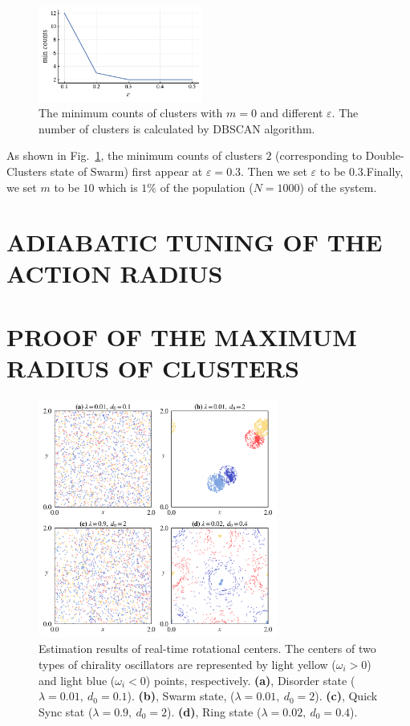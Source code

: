 \documentclass[%
 aip,
 amsmath,amssymb,
 reprint,%
]{revtex4-1}
\begin{document}
\begin{figure}[H]
    \includegraphics[width=0.48\textwidth]{./figs/DBSCANparam.pdf}
    \caption{
        \label{fig:DBSCANparam} The minimum counts of clusters with $m=0$ and different $\varepsilon$. The number of clusters is calculated by DBSCAN algorithm. 
    }
\end{figure}
As shown in Fig.~\ref{fig:DBSCANparam}, the minimum counts of clusters $2$ (corresponding to Double-Clusters state of Swarm) first appear at $\varepsilon=0.3$. Then we set $\varepsilon$ to be $0.3$.Finally, we set $m$ to be $10$ which is $1\%$ of the population ($N=1000$) of the system.

\section{\label{sec:Adiabatic} ADIABATIC TUNING OF THE ACTION RADIUS}

\section{\label{sec:maxRadius}
    PROOF OF THE MAXIMUM RADIUS OF CLUSTERS}

\begin{figure}
    \includegraphics[width=0.7\textwidth]{./figs/etimateCenter.png}
    \caption{
        \label{fig:etimateCenter} Estimation results of real-time rotational centers. 
        The centers of two types of chirality oscillators are represented by light yellow ($\omega_i > 0$) and light blue
        ($\omega_i < 0$) points, respectively.
        \textbf{(a)}, Disorder state ($\lambda=0.01,\ d_0=0.1$).
        \textbf{(b)}, Swarm state, ($\lambda=0.01,\ d_0=2$).
        \textbf{(c)}, Quick Sync stat ($\lambda=0.9,\ d_0=2$).
        \textbf{(d)}, Ring state ($\lambda=0.02,\ d_0=0.4$).
    }
\end{figure}
\end{document}
